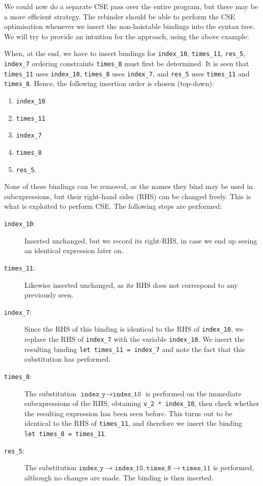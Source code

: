 We could now do a separate CSE pass over the entire program, but there
may be a more efficient strategy.  The rebinder should be able to
perform the CSE optimisation whenever we insert the non-hoistable
bindings into the syntax tree.  We will try to provide an intuition
for the approach, using the above example:

When, at the end, we have to insert bindings for \texttt{index\_10},
\texttt{times\_11}, \texttt{res\_5}, \texttt{index\_7} ordering
constraints \texttt{times\_8} must first be determined.  It is seen
that \texttt{times\_11} uses \texttt{index\_10}, \texttt{times\_8}
uses \texttt{index\_7}, and \texttt{res\_5} uses \texttt{times\_11}
and \texttt{times\_8}.  Hence, the following insertion order is chosen
(top-down):

\begin{enumerate}
\item \texttt{index\_10}
\item \texttt{times\_11}
\item \texttt{index\_7}
\item \texttt{times\_8}
\item \texttt{res\_5}.
\end{enumerate}

None of these bindings can be removed, as the names they bind may be
used in subexpressions, but their right-hand sides (RHS) can be
changed freely.  This is what is exploited to perform CSE.  The
following steps are performed:

\begin{description}
\item[\texttt{index\_10}:] Inserted unchanged, but we record its
  right-RHS, in case we end up seeing an identical expression
  later on.
\item[\texttt{times\_11}:] Likewise inserted unchanged, as its RHS
  does not correspond to any previously seen.
\item[\texttt{index\_7}:] Since the RHS of this binding is identical
  to the RHS of \texttt{index\_10}, we replace the RHS of
  \texttt{index\_7} with the variable \texttt{index\_10}.  We insert
  the resulting binding \texttt{let~times\_11~=~index\_7} and note the
  fact that this substitution has performed.
\item[\texttt{times\_8}:] The substitution
  $\texttt{index\_y}\rightarrow\texttt{index\_10}$ is performed on the
  immediate subexpressions of the RHS, obtaining
  \texttt{v\_2~*~index\_10}, then check whether the resulting
  expression has been seen before.  This turns out to be identical to
  the RHS of \texttt{times\_11}, and therefore we insert the binding
  \texttt{let~times\_8~=~times\_11}.
\item[\texttt{res\_5}:] The substitution
  $\texttt{index\_y}\rightarrow\texttt{index\_10},\texttt{times\_8}\rightarrow\texttt{times\_11}$
  is performed, although no changes are made.  The binding is then
  inserted.
\end{description}


